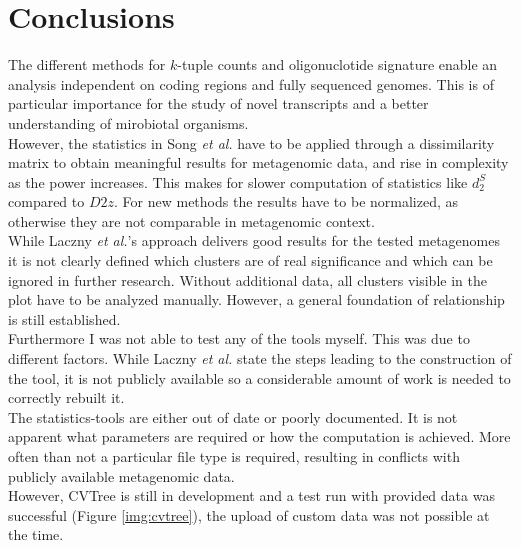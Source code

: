 \documentclass[twocolumn]{bmcart}%
\begin{document}
\section*{Conclusions}
The different methods for $k$-tuple counts and oligonuclotide signature enable an analysis independent on coding regions and fully sequenced genomes. This is of particular importance for the study of novel transcripts and a better understanding of mirobiotal organisms.\\
However, the statistics in Song \textit{et al.} have to be applied through a dissimilarity matrix to obtain meaningful results for metagenomic data, and rise in complexity as the power increases. This makes for slower computation of statistics like $d_2^S$ compared to $D2z$. For new methods the results have to be normalized, as otherwise they are not comparable in metagenomic context.\\
While Laczny \textit{et al.}'s approach delivers good results for the tested metagenomes it is not clearly defined which clusters are of real significance and which can be ignored in further research. Without additional data, all clusters visible in the plot have to be analyzed manually. However, a general foundation of relationship is still established.\\
Furthermore I was not able to test any of the tools myself. This was due to different factors. While Laczny \textit{et al.} state the steps leading to the construction of the tool, it is not publicly available so a considerable amount of work is needed to correctly rebuilt it.\\
The statistics-tools are either out of date or poorly documented. It is not apparent what parameters are required or how the computation is achieved. More often than not a particular file type is required, resulting in conflicts with publicly available metagenomic data.\\
However, CVTree is still in development and a test run with provided data was successful (Figure \ref{img:cvtree}), the upload of custom data was not possible at the time.
\end{document}
